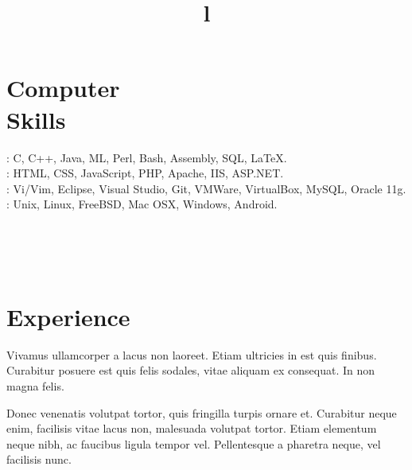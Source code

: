 \documentclass[mm]{simple_style}
\begin{document}
\begin{resume}
\section{Computer\\Skills}

: C, C++, Java, ML, Perl, Bash, Assembly, SQL, \LaTeX.
\\
: HTML, CSS, JavaScript, PHP, Apache, IIS, ASP.NET.
\\
: Vi/Vim, Eclipse, Visual Studio, Git, VMWare, VirtualBox, 
MySQL, Oracle 11g.
\\
: 
Unix, Linux, FreeBSD, Mac OSX, Windows, Android.
\\
\sectionline

\begin{format}
\title{l}\\
\\
\body\\
\end{format}

\section{Experience}
\title{}
\begin{position}
Vivamus ullamcorper a lacus non laoreet. Etiam ultricies in est quis finibus. 
Curabitur posuere est quis felis sodales, vitae aliquam ex consequat. In non 
magna felis.
\end{position}

\title{}
\begin{position}
Donec venenatis volutpat tortor, quis fringilla turpis ornare et. Curabitur 
neque enim, facilisis vitae lacus non, malesuada volutpat tortor. Etiam 
elementum neque nibh, ac faucibus ligula tempor vel. Pellentesque a pharetra 
neque, vel facilisis nunc.
\end{position}


\end{resume}
\end{document}
